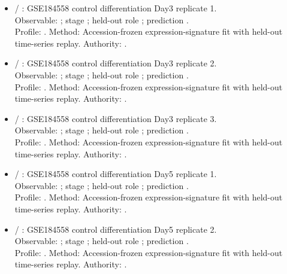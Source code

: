 \begin{itemize}
\item {} / : GSE184558 control differentiation Day3 replicate 1.\\ Observable: ; stage ; held-out role ; prediction .\\ Profile: . Method: Accession-frozen expression-signature fit with held-out time-series replay. Authority: .
\item {} / : GSE184558 control differentiation Day3 replicate 2.\\ Observable: ; stage ; held-out role ; prediction .\\ Profile: . Method: Accession-frozen expression-signature fit with held-out time-series replay. Authority: .
\item {} / : GSE184558 control differentiation Day3 replicate 3.\\ Observable: ; stage ; held-out role ; prediction .\\ Profile: . Method: Accession-frozen expression-signature fit with held-out time-series replay. Authority: .
\item {} / : GSE184558 control differentiation Day5 replicate 1.\\ Observable: ; stage ; held-out role ; prediction .\\ Profile: . Method: Accession-frozen expression-signature fit with held-out time-series replay. Authority: .
\item {} / : GSE184558 control differentiation Day5 replicate 2.\\ Observable: ; stage ; held-out role ; prediction .\\ Profile: . Method: Accession-frozen expression-signature fit with held-out time-series replay. Authority: .

\end{itemize}
